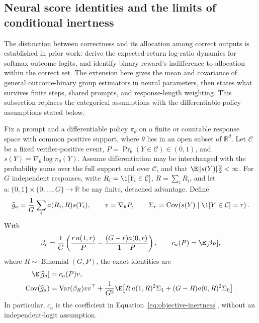\subsection{Neural score identities and the limits of conditional inertness}
\label{app:neural-binary-inertness}

The distinction between correctness and its allocation among correct outputs
is established in prior work: \citet[Theorem~3.1, v1]{sinha2026expected}
derive the expected-return log-ratio dynamics for softmax outcome logits,
and \citet[Section~4.1, v1]{lochab2026ucpo} identify binary reward's
indifference to allocation within the correct set. The extension here gives
the mean and covariance of general outcome-binary group estimators in neural
parameters, then states what survives finite steps, shared prompts, and
response-length weighting. This subsection replaces the categorical
assumptions with the differentiable-policy assumptions stated below.

\begin{theorem}
\enforcehalffinalproseline
\label{thm:neural-binary-moments}
Fix a prompt and a differentiable policy $\pi_\theta$ on a finite or countable
response space with common positive support, where $\theta$ lies in an open
subset of $\mathbb R^d$. Let $\mathcal C$ be a fixed verifier-positive event,
$P=\Pr_\theta(Y\in\mathcal C)\in(0,1)$, and
$s(Y)=\nabla_\theta\log\pi_\theta(Y)$. Assume differentiation may be
interchanged with the probability sums over the full support and over
$\mathcal C$, and that $\E\|s(Y)\|_2^2<\infty$. For $G$ independent
responses, write $R_i=\1[Y_i\in\mathcal C]$, $R=\sum_iR_i$, and let
$a:\{0,1\}\times\{0,\ldots,G\}\to\mathbb R$ be any finite, detached
advantage. Define
\[
 \widehat g_a=\frac1G\sum_i a(R_i,R)s(Y_i),\qquad
 v=\nabla_\theta P,\qquad
 \Sigma_r=\operatorname{Cov}\!\left(s(Y)\mid\1[Y\in\mathcal C]=r\right).
\]
With
\[
 \beta_r=\frac1G\left(\frac{r\,a(1,r)}P
          -\frac{(G-r)a(0,r)}{1-P}\right),
 \qquad c_a(P)=\E[\beta_R],
\]
where $R\sim\operatorname{Binomial}(G,P)$, the exact identities are
\begin{align}
 \E[\widehat g_a]&=c_a(P)v,
 \label{eq:neural-binary-mean}\\
 \operatorname{Cov}(\widehat g_a)
 &=\operatorname{Var}(\beta_R)vv^\top
   +\frac1{G^2}\E\!\left[
       R\,a(1,R)^2\Sigma_1+(G-R)a(0,R)^2\Sigma_0\right].
 \label{eq:neural-binary-covariance}
\end{align}
In particular, $c_a$ is the coefficient in
Equation~\eqref{eq:objective-inertness}, without an independent-logit
assumption.
\end{theorem}

